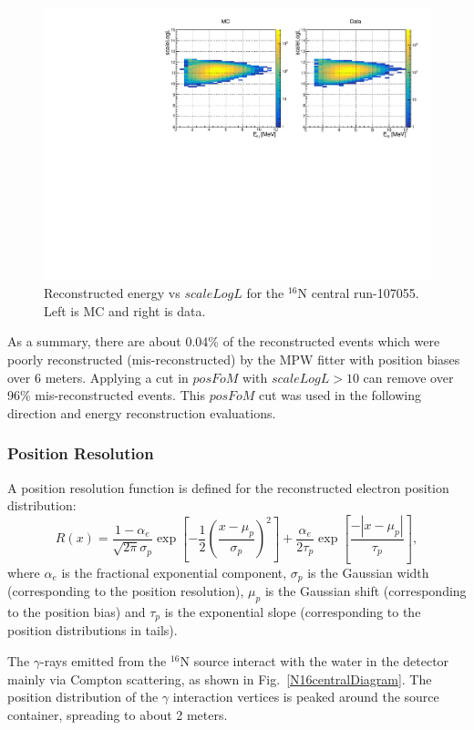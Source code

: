 \begin{figure}[!htb]
	\centering
	\includegraphics[width=13cm]{N16_107055_scaleLogLvsEnergy.pdf}
	\caption{Reconstructed energy vs $scaleLogL$ for the $^{16}$N central run-107055. Left is MC and right is data.}
	\label{energyVsFOM}
\end{figure}

As a summary, there are about 0.04\% of the reconstructed events which were poorly reconstructed (mis-reconstructed) by the MPW fitter with position biases over 6 meters. Applying a cut in $posFoM$ with $scaleLogL>10$ can remove over 96\% mis-reconstructed events. This $posFoM$ cut was used in the following direction and energy reconstruction evaluations.

\subsubsection{Position Resolution}
A position resolution function is defined for the reconstructed electron position distribution\cite{boulay2004direct}:
\begin{equation}
R(x)=\frac{1-\alpha_e}{\sqrt{2\pi}\sigma_p}\exp{[-\frac{1}{2}(\frac{x-\mu_p}{\sigma_p})^2]+\frac{\alpha_e}{2\tau_p}\exp{[\frac{-|x-\mu_p|}{\tau_p}]}},
\end{equation}
where $\alpha_e$ is the fractional exponential component, $\sigma_p$ is
the Gaussian width (corresponding to the position resolution), $\mu_p$ is the Gaussian shift (corresponding to the position bias) and $\tau_p$ is the exponential slope (corresponding to the position distributions in tails).

The $\gamma$-rays emitted from the $^{16}$N source interact with the water in the detector mainly via Compton scattering, as shown in Fig.~\ref{N16centralDiagram}. The position distribution of the $\gamma$ interaction vertices is peaked around the source container, spreading to about 2 meters.

